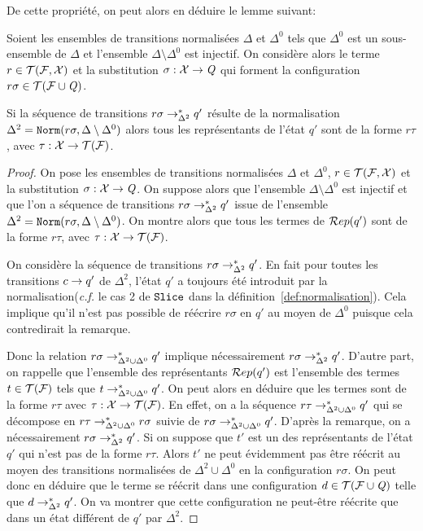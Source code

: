 De cette propriété, on peut alors en déduire le lemme suivant: 
\begin{lemma}
  \label{prop:norm_representant}
  Soient les ensembles de transitions normalisées $\Delta$ et $\Delta^0$
  tels que $\Delta^0$ est un sous-ensemble de $\Delta$ et l'ensemble $\Delta \setminus \Delta^0$ est injectif.
  On considère alors le terme $r \in \mathcal{T(F, X)}$ et la substitution $\sigma : \mathcal X \rightarrow \mathit Q$ qui forment la configuration $r\sigma \in \mathcal{ T(F \cup \mathit Q)}$.

  Si la séquence de transitions $r\sigma \rightarrow_{\Delta^2}^* q'$ résulte de la normalisation $\Delta^2=\mathtt{Norm}(r\sigma, \Delta \setminus \Delta^0)$
  alors tous les représentants de l'état $q'$ sont de la forme $r\tau$, avec $\tau: \mathcal X \rightarrow \mathcal{T(F)}$.
\end{lemma}

\begin{proof}
  On pose les ensembles de transitions normalisées $\Delta$ et $\Delta^0$, $r \in \mathcal{T(F, X)}$ et la substitution $\sigma : \mathcal X \rightarrow \mathit Q$.
  On suppose alors que l'ensemble $\Delta \setminus \Delta^0$ est injectif et que l'on a séquence de transitions $r\sigma \rightarrow_{\Delta^2}^* q'$
  issue de l'ensemble $\Delta^2=\mathtt{Norm}(r\sigma, \Delta \setminus \Delta^0)$. On montre alors que tous les termes de $\mathcal R ep(q')$ sont de la forme
  $r\tau$, avec $\tau: \mathcal X \rightarrow \mathcal{T(F)}$.
  
  On considère la séquence de transitions $r\sigma \rightarrow_{\Delta^2}^* q'$. 
  En fait pour toutes les transitions $c \rightarrow q'$ de $\Delta^2$, l'état $q'$ a toujours été introduit 
  par la normalisation(\textit{c.f.} le cas 2 de $\mathtt{Slice}$ dans la définition~\ref{def:normalisation}). 
  Cela implique qu'il n'est pas possible de réécrire $r\sigma$ en $q'$ au moyen de $\Delta^0$ puisque cela contredirait la remarque.

  Donc la relation $r\sigma \rightarrow_{\Delta^2 \cup \Delta^0}^* q'$ implique nécessairement $r\sigma \rightarrow_{\Delta^2}^* q'$.
  D'autre part, on rappelle que l'ensemble des représentants $\mathcal R ep(q')$ est l'ensemble des termes $t \in \mathcal{T(F)}$ tels que $t \rightarrow_{\Delta^2 \cup \Delta^0}^* q'$.
  On peut alors en déduire que les termes sont de la forme $r\tau$ avec $\tau: \mathcal X \rightarrow \mathcal{T(F)}$.
  En effet, on a la séquence $r\tau\rightarrow_{\Delta^2 \cup \Delta^0}^* q'$ qui se décompose en $r\tau\rightarrow^*_{\Delta^2 \cup \Delta^0} r\sigma$
  suivie de $r\sigma \rightarrow_{\Delta^2 \cup \Delta^0}^* q'$. D'après la remarque, on a nécessairement $r\sigma \rightarrow_{\Delta^2}^* q'$.
  Si on suppose que $t'$ est un des représentants de l'état $q'$ qui n'est pas de la forme $r\tau$.
  Alors $t'$ ne peut évidemment pas être réécrit au moyen des transitions normalisées de $\Delta^2 \cup \Delta^0$ en la configuration $r\sigma$.
  On peut donc en déduire que le terme se réécrit dans une configuration $d \in \mathcal{ T(F \cup \mathit Q)}$ telle que $d \rightarrow_{\Delta^2}^* q'$.
  On va montrer que cette configuration ne peut-être réécrite que dans un état différent de $q'$ par $\Delta^2$.


\end{proof}
